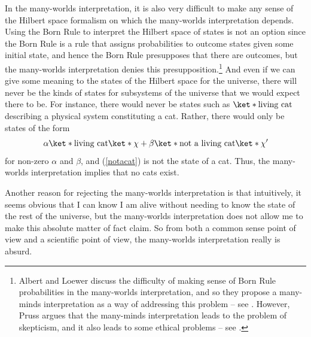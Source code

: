 \documentclass[12pt]{report}
\begin{document}
      In the many-worlds interpretation, it is also very difficult to make any sense of the Hilbert space formalism on which the many-worlds interpretation depends. Using the Born Rule to interpret the Hilbert space of states is not an option since the Born Rule is a rule that assigns probabilities to outcome states given some initial state, and hence the Born Rule presupposes that there are outcomes, but the many-worlds interpretation denies this presupposition.\footnote{Albert and Loewer discuss the difficulty of making sense of Born Rule probabilities in the many-worlds interpretation, and so they propose a many-minds interpretation as a way of addressing this problem -- see \cite{AlbertDavid1988ItMW}. However, Pruss argues that 
      the many-minds interpretation leads to the problem of skepticism, and it also leads to some ethical problems -- see \cite[106--109]{PrussAlexanderR.2018ATFI}.} And even if we can give some meaning to the states of the Hilbert space for the universe, there will never be the kinds of states for subsystems of the universe that we would expect there to be. For instance, there would never be states such as $\ket*{\text{living cat}}$ describing a physical system constituting a cat. Rather, there would only be states of the form  
      \begin{equation}\label{notacat}
      \alpha\ket*{\text{living cat}}\ket*{\chi}+\beta\ket*{\text{not a living cat}}\ket*{\chi'}
    \end{equation} for non-zero $\alpha$ and $\beta$, and (\ref{notacat}) is not the state of a cat. Thus, the many-worlds interpretation implies that 
    no cats exist.

      
      Another reason for rejecting the many-worlds interpretation is that intuitively, it seems obvious that I can know I am alive without needing to know the state of the rest of the universe, but the many-worlds interpretation does not allow me to make this absolute matter of fact claim. 
       So from both a common sense point of view and a scientific point of view, the many-worlds interpretation really is absurd.
       
\end{document}
